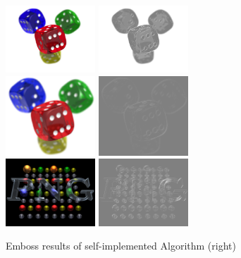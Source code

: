 \begin{figure}[H]
    \centering

    \includegraphics[width=0.30\textwidth]{images/dice.png}
    \includegraphics[width=0.30\textwidth]{images/results/emboss-my.dice.png}
    \\
    \includegraphics[width=0.30\textwidth]{images/dice_large.png}
    \includegraphics[width=0.30\textwidth]{images/results/emboss-my.dice_large.png}
    \\
    \includegraphics[width=0.30\textwidth]{images/pnglogo-blk.png}
    \includegraphics[width=0.30\textwidth]{images/results/emboss-my.pnglogo-blk.png}
    
    \begin{center}
        \caption{Emboss results of self-implemented Algorithm (right)}
    \end{center}

    \label{fig:emboss1}
\end{figure}

